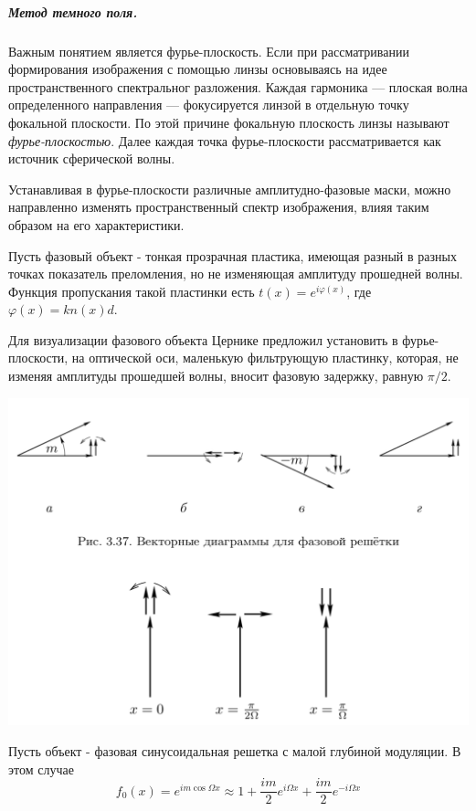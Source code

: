 \documentclass[12pt]{article}
\renewcommand{\phi}{\ensuremath{\varphi}}
\begin{document}
		\subparagraph{Метод темного поля.}
		Важным понятием является фурье-плоскость. Если при рассматривании формирования изображения с помощью линзы основываясь на идее пространственного спектральног разложения. Каждая гармоника --- плоская волна определенного направления --- фокусируется линзой в отдельную точку фокальной плоскости. 
		 По этой причине фокальную плоскость линзы называют \textit{фурье-плоскостью}. Далее каждая точка фурье-плоскости рассматривается как источник сферической волны.
		
		 Устанавливая в фурье-плоскости различные амплитудно-фазовые маски, можно направленно изменять пространственный спектр изображения, влияя таким образом на его характеристики.
		 
		 Пусть фазовый объект - тонкая прозрачная пластика, имеющая разный в разных точках показатель преломления, но не изменяющая амплитуду прошедней волны. Функция пропускания такой пластинки есть $t(x) = e^{i\phi(x)}$, где $\phi(x) = kn(x)d$.
		 
		 Для визуализации фазового объекта Цернике предложил установить в фурье-плоскости, на оптической оси, маленькую фильтрующую пластинку, которая, не изменяя амплитуды прошедшей волны, вносит фазовую задержку, равную $\pi/2$.  
		 \begin{center}
		 	
		 
		 \includegraphics[scale=.8]{faz_diags}
		\end{center}
		 Пусть объект - фазовая синусоидальная решетка с малой глубиной модуляции. В этом случае 
		 $$f_0(x) = e^{im\cos \Omega x} \approx 1 +  \dfrac{im}{2}e^{i\Omega x} + \dfrac{im}{2}e^{-i\Omega x}$$
		 
\end{document}

